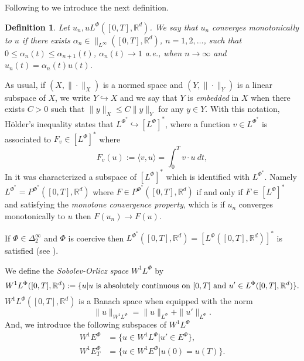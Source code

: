 \documentclass[twoside]{article}
\newtheorem{defi}[thm]{Definition}
\theoremstyle{remark}
\newcommand{\orlnor}{\|_{L^{\Phi}}}
\newcommand{\linf}{\|_{L^{\infty}}}
\newcommand{\lphi}{L^{\Phi}}
\newcommand{\lpsi}{L^{\Phi^*}}
\newcommand{\ephi}{E^{\Phi}}
\newcommand{\wphi}{W^{1}\lphi}
\newcommand{\wphie}{W^{1}\ephi}
\newcommand{\rr}{\mathbb{R}}
\renewcommand{\leq}{\leqslant}
\newcommand{\Phie}{\Phi^{*}}
\begin{document}
Following to \cite{Desch2001} we introduce the next definition.

\begin{defi} Let $u_n,u\lphi([0,T],\rr^d)$. We say that $u_n$ converges monotonically to $u$ if there exists $\alpha_n\in\linf([0,T],\rr^d)$, $n=1,2,\ldots$, such that $0\leq \alpha_n(t)\leq \alpha_{n+1}(t)$, $\alpha_n(t)\to 1$ a.e., when $n\to\infty$ and $u_n(t)=\alpha_n(t)u(t)$.

\end{defi}

 
As usual, if $(X,\|\cdot\|_X)$ is a normed space and $(Y,\|\cdot \|_Y)$ is a linear subspace of $X$,  we write $Y\hookrightarrow X$ and we say that $Y$ is \emph{embedded} in $X$  when there exists $C>0$ such that
$\|y\|_X\leq C\|y\|_Y$ for any $y\in Y$.  With this notation, H\"older's inequality states that  $\lpsi\hookrightarrow  \left[\lphi\right]^*$, where a function $v\in\lpsi$ is associated  to $F_v\in \left[\lphi\right]^*$ where
\begin{equation}\label{pairing}
  F_v(u):=\langle v,u\rangle=\int_0^Tv\cdot u\ dt,
\end{equation}
 In  \cite[Thm 2.9]{Desch2001}  it was characterized a subspace of   $\left[\lphi\right]^*$ which is identified with $\lpsi$. Namely $\lpsi=P^{\Phie}([0,T],\rr^d)$ where $F\in P^{\Phie}([0,T],\rr^d)$ if and only if $F\in\left[\lphi\right]^*$ and satisfying the \emph{monotone convergence property}, which is if $u_n$ converges monotonically to $u$ then $F(u_n)\to F(u)$.

 If $\Phi \in \Delta_2^{\infty}$ and $\Phi$ is coercive then $\lpsi([0,T],\rr^d)= \left[\lphi([0,T],\rr^d)\right]^*$ is satisfied (see \cite[Thm. 2.9 , Thm. 2.10]{Desch2001}).





We define the \emph{Sobolev-Orlicz space} $\wphi$ by
\[\wphi([0,T],\rr^d):=\{u| u \hbox{ is absolutely continuous on $[0,T]$ and } u'\in \lphi([0,T],\rr^d)\}.\]
$\wphi([0,T],\rr^d)$ is a Banach space when equipped with the norm
\begin{equation}\label{def-norma-orlicz-sob}
\|  u  \|_{\wphi}= \|  u  \|_{\lphi} + \|u'\orlnor.
\end{equation}
And, we introduce the following subspaces of $\wphi$
\begin{equation}\label{def-esp-orlicz-sob-per}
\begin{split}
\wphie&=\{u\in\wphi|u'\in\ephi\},\\
\wphie_T&=\{u\in\wphie|u(0)=u(T)\}.
\end{split}
\end{equation}
\end{document}
